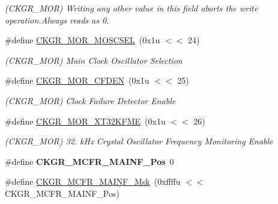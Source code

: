 \begin{DoxyCompactItemize}
\begin{DoxyCompactList}\small\item\em (C\+K\+G\+R\+\_\+\+M\+OR) Writing any other value in this field aborts the write operation.\+Always reads as 0. \end{DoxyCompactList}\item 
\mbox{\label{group__SAME70__PMC_gaa1d09a0e1aea4606def1a71287833035}} 
\#define \mbox{\hyperlink{group__SAME70__PMC_gaa1d09a0e1aea4606def1a71287833035}{C\+K\+G\+R\+\_\+\+M\+O\+R\+\_\+\+M\+O\+S\+C\+S\+EL}}~(0x1u $<$$<$ 24)
\begin{DoxyCompactList}\small\item\em (C\+K\+G\+R\+\_\+\+M\+OR) Main Clock Oscillator Selection \end{DoxyCompactList}\item 
\mbox{\label{group__SAME70__PMC_gadb0661f3af5679f457c07a3a3ace4af4}} 
\#define \mbox{\hyperlink{group__SAME70__PMC_gadb0661f3af5679f457c07a3a3ace4af4}{C\+K\+G\+R\+\_\+\+M\+O\+R\+\_\+\+C\+F\+D\+EN}}~(0x1u $<$$<$ 25)
\begin{DoxyCompactList}\small\item\em (C\+K\+G\+R\+\_\+\+M\+OR) Clock Failure Detector Enable \end{DoxyCompactList}\item 
\mbox{\label{group__SAME70__PMC_ga8f908a11bf0b0c5974ae028099037327}} 
\#define \mbox{\hyperlink{group__SAME70__PMC_ga8f908a11bf0b0c5974ae028099037327}{C\+K\+G\+R\+\_\+\+M\+O\+R\+\_\+\+X\+T32\+K\+F\+ME}}~(0x1u $<$$<$ 26)
\begin{DoxyCompactList}\small\item\em (C\+K\+G\+R\+\_\+\+M\+OR) 32. k\+Hz Crystal Oscillator Frequency Monitoring Enable \end{DoxyCompactList}\item 
\mbox{\label{group__SAME70__PMC_gad686e71166d30ed77a919900cd438b4b}} 
\#define {\bfseries C\+K\+G\+R\+\_\+\+M\+C\+F\+R\+\_\+\+M\+A\+I\+N\+F\+\_\+\+Pos}~0
\item 
\mbox{\label{group__SAME70__PMC_ga57b367ae43ea4e0e406c54672607eaf8}} 
\#define \mbox{\hyperlink{group__SAME70__PMC_ga57b367ae43ea4e0e406c54672607eaf8}{C\+K\+G\+R\+\_\+\+M\+C\+F\+R\+\_\+\+M\+A\+I\+N\+F\+\_\+\+Msk}}~(0xffffu $<$$<$ C\+K\+G\+R\+\_\+\+M\+C\+F\+R\+\_\+\+M\+A\+I\+N\+F\+\_\+\+Pos)

\end{DoxyCompactItemize}

